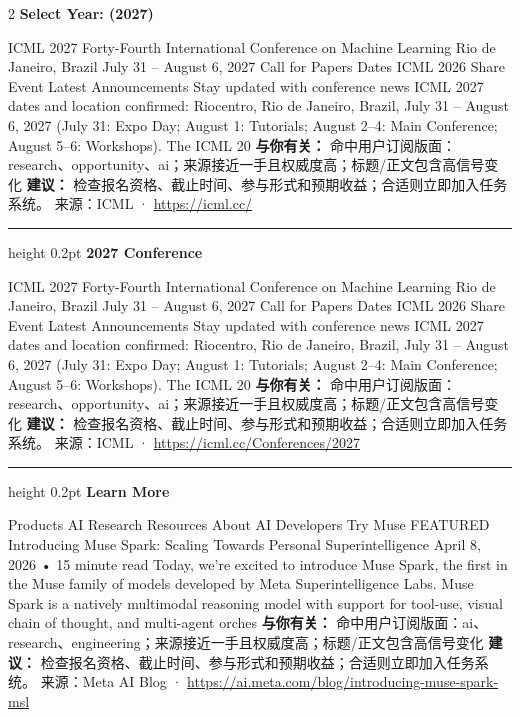 \documentclass[10.5pt]{ctexart}
\begin{document}
\begin{multicols}{2}
{\large\bfseries Select Year: (2027)}\par
ICML 2027 Forty-Fourth International Conference on Machine Learning Rio de Janeiro, Brazil July 31 – August 6, 2027 Call for Papers Dates ICML 2026 Share Event Latest Announcements Stay updated with conference news ICML 2027 dates and location confirmed: Riocentro, Rio de Janeiro, Brazil, July 31 – August 6, 2027 (July 31: Expo Day; August 1: Tutorials; August 2–4: Main Conference; August 5–6: Workshops). The ICML 20
\textbf{与你有关：} 命中用户订阅版面：research、opportunity、ai；来源接近一手且权威度高；标题/正文包含高信号变化
\textbf{建议：} 检查报名资格、截止时间、参与形式和预期收益；合适则立即加入任务系统。
{\footnotesize\color{ormuted} 来源：ICML · \url{https://icml.cc/}}
\vspace{2mm}
\hrule height 0.2pt
\vspace{2mm}
{\large\bfseries 2027 Conference}\par
ICML 2027 Forty-Fourth International Conference on Machine Learning Rio de Janeiro, Brazil July 31 – August 6, 2027 Call for Papers Dates ICML 2026 Share Event Latest Announcements Stay updated with conference news ICML 2027 dates and location confirmed: Riocentro, Rio de Janeiro, Brazil, July 31 – August 6, 2027 (July 31: Expo Day; August 1: Tutorials; August 2–4: Main Conference; August 5–6: Workshops). The ICML 20
\textbf{与你有关：} 命中用户订阅版面：research、opportunity、ai；来源接近一手且权威度高；标题/正文包含高信号变化
\textbf{建议：} 检查报名资格、截止时间、参与形式和预期收益；合适则立即加入任务系统。
{\footnotesize\color{ormuted} 来源：ICML · \url{https://icml.cc/Conferences/2027}}
\vspace{2mm}
\hrule height 0.2pt
\vspace{2mm}
{\large\bfseries Learn More}\par
Products AI Research Resources About AI Developers Try Muse FEATURED Introducing Muse Spark: Scaling Towards Personal Superintelligence April 8, 2026 • 15 minute read Today, we’re excited to introduce Muse Spark, the first in the Muse family of models developed by Meta Superintelligence Labs. Muse Spark is a natively multimodal reasoning model with support for tool-use, visual chain of thought, and multi-agent orches
\textbf{与你有关：} 命中用户订阅版面：ai、research、engineering；来源接近一手且权威度高；标题/正文包含高信号变化
\textbf{建议：} 检查报名资格、截止时间、参与形式和预期收益；合适则立即加入任务系统。
{\footnotesize\color{ormuted} 来源：Meta AI Blog · \url{https://ai.meta.com/blog/introducing-muse-spark-msl}}

\end{multicols}
\end{document}
